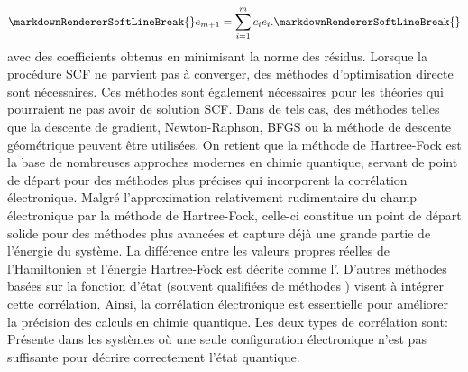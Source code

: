 {}\begin{equation}\markdownRendererSoftLineBreak
{}e_{m+1} = \sum_{i=1}^m c_i e_i.\markdownRendererSoftLineBreak
{}\end{equation}\markdownRendererSoftLineBreak
{}avec des coefficients  obtenus en minimisant la norme des résidus.\markdownRendererParagraphSeparator
{}Lorsque la procédure SCF ne parvient pas à converger, des méthodes d'optimisation directe sont nécessaires. Ces\markdownRendererSoftLineBreak
{}méthodes sont également nécessaires pour les théories qui pourraient ne pas avoir de solution SCF. Dans de tels cas, des\markdownRendererSoftLineBreak
{}méthodes telles que la descente de gradient, Newton-Raphson, BFGS ou la méthode de descente géométrique peuvent être utilisées.\markdownRendererParagraphSeparator
{}On retient que la méthode de Hartree-Fock est la base de nombreuses approches modernes en chimie quantique, servant de point de départ pour des méthodes plus précises qui incorporent la corrélation électronique.\markdownRendererInterblockSeparator
{}
\markdownRendererSectionEnd 
\markdownRendererSectionEnd \markdownRendererSectionBegin
{}\markdownRendererInterblockSeparator
{}Malgré l'approximation relativement rudimentaire du champ électronique par la méthode de Hartree-Fock, celle-ci constitue un point de départ solide pour des méthodes plus avancées et capture déjà une grande partie de l’énergie  du système. La différence entre les valeurs propres réelles de l’Hamiltonien et l’énergie Hartree-Fock est décrite comme l’.\markdownRendererInterblockSeparator
{}\markdownRendererInterblockSeparator
{} D'autres méthodes basées sur la fonction d'état (souvent qualifiées de méthodes ) visent à intégrer cette corrélation. Ainsi, la corrélation électronique est essentielle pour améliorer la précision des calculs en chimie quantique.\markdownRendererParagraphSeparator
{} Les deux types de corrélation sont:\markdownRendererInterblockSeparator
{}\markdownRendererOlBegin
{}\markdownRendererInterblockSeparator
{}\markdownRendererUlBeginTight
\markdownRendererUlItem Présente dans les systèmes où une seule configuration électronique n’est pas suffisante pour décrire correctement l’état quantique.\markdownRendererUlItemEnd 
